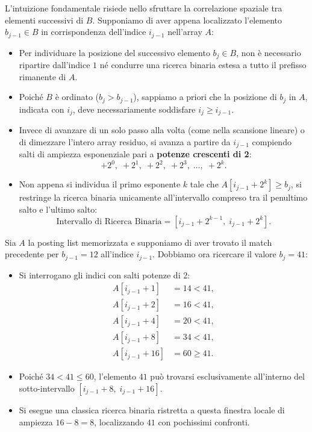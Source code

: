L'intuizione fondamentale risiede nello sfruttare la correlazione spaziale tra elementi successivi di $B$. Supponiamo di aver appena localizzato l'elemento $b_{j-1} \in B$ in corrispondenza dell'indice $i_{j-1}$ nell'array $A$:
\begin{itemize}
  \item Per individuare la posizione del successivo elemento $b_j \in B$, non è necessario ripartire dall'indice $1$ né condurre una ricerca binaria estesa a tutto il prefisso rimanente di $A$.
  \item Poiché $B$ è ordinato ($b_j > b_{j-1}$), sappiamo a priori che la posizione di $b_j$ in $A$, indicata con $i_j$, deve necessariamente soddisfare $i_j \ge i_{j-1}$.
  \item Invece di avanzare di un solo passo alla volta (come nella scansione lineare) o di dimezzare l'intero array residuo, si avanza a partire da $i_{j-1}$ compiendo salti di ampiezza esponenziale pari a \textbf{potenze crescenti di 2}:
  \begin{equation}
    +2^0, \; +2^1, \; +2^2, \; +2^3, \; \dots, \; +2^k.
  \end{equation}
  \item Non appena si individua il primo esponente $k$ tale che $A[i_{j-1} + 2^k] \ge b_j$, si restringe la ricerca binaria unicamente all'intervallo compreso tra il penultimo salto e l'ultimo salto:
  \begin{equation}
    \text{Intervallo di Ricerca Binaria} = \left[i_{j-1} + 2^{k-1}, \; i_{j-1} + 2^k\right].
  \end{equation}
\end{itemize}

\begin{example}
Sia $A$ la posting list memorizzata e supponiamo di aver trovato il match precedente per $b_{j-1} = 12$ all'indice $i_{j-1}$. Dobbiamo ora ricercare il valore $b_j = 41$:
\begin{itemize}
  \item Si interrogano gli indici con salti potenze di 2:
  \begin{align*}
    A[i_{j-1} + 1] &= 14 < 41, \\
    A[i_{j-1} + 2] &= 16 < 41, \\
    A[i_{j-1} + 4] &= 20 < 41, \\
    A[i_{j-1} + 8] &= 34 < 41, \\
    A[i_{j-1} + 16] &= 60 \ge 41.
  \end{align*}
  \item Poiché $34 < 41 \le 60$, l'elemento $41$ può trovarsi esclusivamente all'interno del sotto-intervallo $[i_{j-1} + 8, \; i_{j-1} + 16]$.
  \item Si esegue una classica ricerca binaria ristretta a questa finestra locale di ampiezza $16 - 8 = 8$, localizzando $41$ con pochissimi confronti.
\end{itemize}
\end{example}

